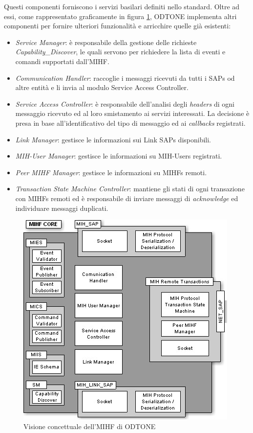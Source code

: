 Questi componenti forniscono i servizi basilari definiti nello standard. Oltre ad essi, come rappresentato graficamente in figura \ref{fig:mihfarch}, ODTONE implementa altri componenti per fornire ulteriori funzionalità e arricchire quelle già esistenti:
\begin{itemize}
\item {\em Service Manager}: è responsabile della gestione delle richieste {\em Capability\_Discover}, le quali servono per richiedere la lista di eventi e comandi supportati dall'MIHF.

\item {\em Communication Handler}: raccoglie i messaggi ricevuti da tutti i SAPs od altre entità e li invia al modulo Service Access Controller.

\item {\em Service Access Controller}: è responsabile dell'analisi degli {\em headers} di ogni messaggio ricevuto ed al loro smistamento ai servizi interessati. La decisione è presa in base all'identificativo del tipo di messaggio ed ai {\em callbacks} registrati.

\item {\em Link Manager}: gestisce le informazioni sui Link SAPs disponibili.

\item {\em MIH-User Manager}: gestisce le informazioni su MIH-Users registrati.

\item {\em Peer MIHF Manager}: gestisce le informazioni su MIHFs remoti.

\item {\em Transaction State Machine Controller}: mantiene gli stati di ogni transazione con MIHFs remoti ed è responsabile di inviare messaggi di {\em acknowledge} ed individuare messaggi duplicati.

\end{itemize}

\begin{figure}
\centering
\includegraphics[]{mihfarch.jpg}
\caption{Visione concettuale dell'MIHF di ODTONE}
\label{fig:mihfarch}
\end{figure}


